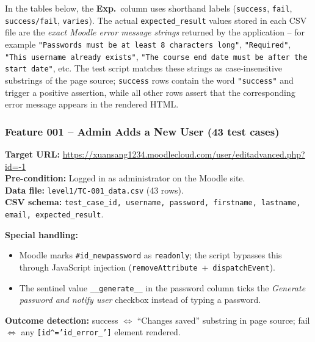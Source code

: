 \documentclass[twoside,final]{hcmut-report}
\begin{document}
\begin{tcolorbox}[colback=yellow!8!white, colframe=orange!70!black, title=Note on \textbf{Exp.} column values, fonttitle=\small\bfseries, left=4pt, right=4pt, top=4pt, bottom=4pt]
\small
In the tables below, the \textbf{Exp.}\ column uses shorthand labels (\texttt{success}, \texttt{fail}, \texttt{success/fail}, \texttt{varies}).
The actual \texttt{expected\_result} values stored in each CSV file are the \emph{exact Moodle error message strings} returned by the application -- for example \texttt{"Passwords must be at least 8 characters long"}, \texttt{"Required"}, \texttt{"This username already exists"}, \texttt{"The course end date must be after the start date"}, etc.
The test script matches these strings as case-insensitive substrings of the page source; \texttt{success} rows contain the word \texttt{"success"} and trigger a positive assertion, while all other rows assert that the corresponding error message appears in the rendered HTML.
\end{tcolorbox}

\subsubsection{Feature 001 -- Admin Adds a New User (43 test cases)}

\textbf{Target URL:} \url{https://xuansang1234.moodlecloud.com/user/editadvanced.php?id=-1}\\
\textbf{Pre-condition:} Logged in as administrator on the Moodle site.\\
\textbf{Data file:} \texttt{level1/TC-001\_data.csv} (43 rows).\\
\textbf{CSV schema:} \texttt{test\_case\_id, username, password, firstname, lastname, email, expected\_result}.

\textbf{Special handling:}
\begin{itemize}
    \item Moodle marks \texttt{\#id\_newpassword} as \texttt{readonly}; the script bypasses this through JavaScript injection (\texttt{removeAttribute}~+~\texttt{dispatchEvent}).
    \item The sentinel value \texttt{\_\_generate\_\_} in the password column ticks the \emph{Generate password and notify user} checkbox instead of typing a password.
\end{itemize}
\textbf{Outcome detection:} success $\Leftrightarrow$ ``Changes saved'' substring in page source; fail $\Leftrightarrow$ any \texttt{[id\^{}='id\_error\_']} element rendered.
\end{document}
